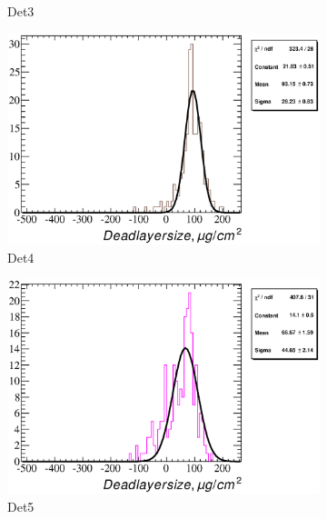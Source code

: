 \documentclass[a4paper,12pt]{article}
\begin{document}
\begin{figure}
\begin{subfigure}[b]{0.325\textwidth}
\caption{Det3}
\end{subfigure}
\begin{subfigure}[b]{0.325\textwidth}
\includegraphics[width=\textwidth]{gfx/run13_alpha_study/Y2U/c_hDeadLayerSize_by_run_distribution4_Y2U.eps}
\caption{Det4}
\end{subfigure}
\hfill
\begin{subfigure}[b]{0.325\textwidth}
\includegraphics[width=\textwidth]{gfx/run13_alpha_study/Y2U/c_hDeadLayerSize_by_run_distribution5_Y2U.eps}
\caption{Det5}
\end{subfigure}
\hfill
\begin{subfigure}[b]{0.325\textwidth}

\end{subfigure}
\end{figure}
\end{document}
